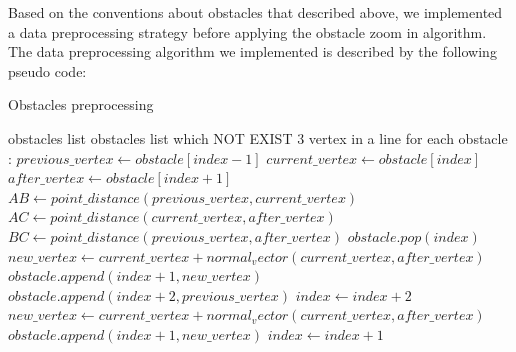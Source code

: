 \documentclass[13pt,a4paper]{article}
\begin{document}
	Based on the conventions about obstacles that described above, we implemented a data preprocessing strategy before applying the obstacle zoom in algorithm. The data preprocessing algorithm we implemented is described by the following pseudo code: \\
	\begin{algorithm}
		\caption{Obstacles preprocessing}
		\begin{algorithmic}[1]
			\REQUIRE obstacles list
			\ENSURE obstacles list which NOT EXIST 3 vertex in a line for each obstacle
			\Statex
			:
			\STATE $previous\_vertex \gets obstacle[index - 1]$
			\STATE $current\_vertex \gets obstacle[index]$
			\STATE $after\_vertex \gets obstacle[index + 1]$
			\STATE $AB \gets point\_distance(previous\_vertex, current\_vertex)$
			\STATE $AC \gets point\_distance(current\_vertex, after\_vertex)$
			\STATE $BC \gets point\_distance(previous\_vertex, after\_vertex)$
			\STATE $obstacle.pop(index)$
			\STATE $new\_vertex \gets current\_vertex + normal_vector(current\_vertex, after\_vertex)$
			\STATE $obstacle.append(index + 1, new\_vertex)$
			\STATE $obstacle.append(index + 2, previous\_vertex)$
			\STATE $index \gets index + 2$
			\STATE $new\_vertex \gets current\_vertex + normal_vector(current\_vertex, after\_vertex)$
			\STATE $obstacle.append(index + 1, new\_vertex)$
			\STATE $index \gets index + 1$
			\ENDIF
			\ENDFOR
			\ENDFOR
			\EndFunction
		\end{algorithmic}
	\end{algorithm}
	
\end{document}
